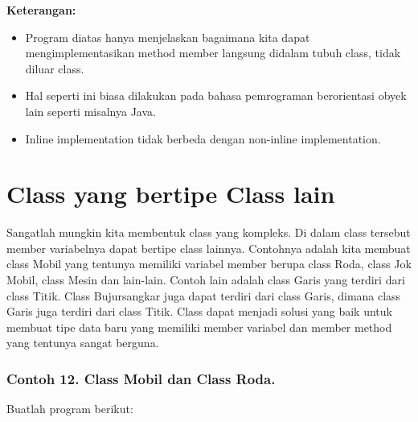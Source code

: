 \textbf{Keterangan:}

\begin{itemize}
\tightlist
\item
  Program diatas hanya menjelaskan bagaimana kita dapat
  mengimplementasikan method member langsung didalam tubuh class, tidak
  diluar class.
\item
  Hal seperti ini biasa dilakukan pada bahasa pemrograman berorientasi
  obyek lain seperti misalnya Java.
\item
  Inline implementation tidak berbeda dengan non-inline implementation.
\end{itemize}

\section{Class yang bertipe Class
lain}\label{class-yang-bertipe-class-lain}

Sangatlah mungkin kita membentuk class yang kompleks. Di dalam class
tersebut member variabelnya dapat bertipe class lainnya. Contohnya
adalah kita membuat class Mobil yang tentunya memiliki variabel member
berupa class Roda, class Jok Mobil, class Mesin dan lain-lain. Contoh
lain adalah class Garis yang terdiri dari class Titik. Class
Bujursangkar juga dapat terdiri dari class Garis, dimana class Garis
juga terdiri dari class Titik. Class dapat menjadi solusi yang baik
untuk membuat tipe data baru yang memiliki member variabel dan member
method yang tentunya sangat berguna.

\subsubsection*{Contoh 12. Class Mobil dan Class Roda.}

Buatlah program berikut:

